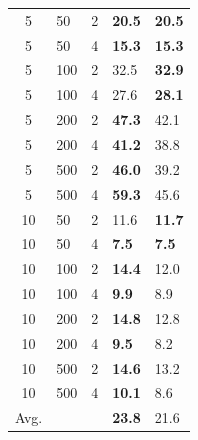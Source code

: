 \begin{table}[t]
\begin{minipage}{0.4\textwidth}
{\begin{tabular}{cll|ll}
				\hline
 5 &  50 & 2 & \textbf{20.5} & \textbf{20.5} \\
5 &  50 & 4 & \textbf{15.3} & \textbf{15.3} \\
 5 & 100 & 2 & 32.5 & \textbf{32.9} \\
 5 & 100 & 4 & 27.6 & \textbf{28.1} \\
 5 & 200 & 2 & \textbf{47.3} & 42.1 \\
 5 & 200 & 4 & \textbf{41.2} & 38.8 \\
 5 & 500 & 2 & \textbf{46.0} & 39.2 \\
 5 & 500 & 4 & \textbf{59.3} & 45.6 \\ \hline
 10 &  50 & 2 & {11.6} & \textbf{11.7} \\
 10 &  50 & 4 & \textbf{7.5} & \textbf{7.5} \\
 10 & 100 & 2 & \textbf{14.4} & 12.0 \\
 10 & 100 & 4 & \textbf{9.9} & 8.9 \\
 10 & 200 & 2 & \textbf{14.8} & 12.8 \\
 10 & 200 & 4 & \textbf{9.5} & 8.2 \\
 10 & 500 & 2 & \textbf{14.6} & 13.2 \\
 10 & 500 & 4 & \textbf{10.1} & 8.6 \\
				\hline \hline
Avg. &    &   &   \textbf{23.8}    & 21.6 \\ \hline \hline
		\end{tabular}}
	\end{minipage}

\end{table}